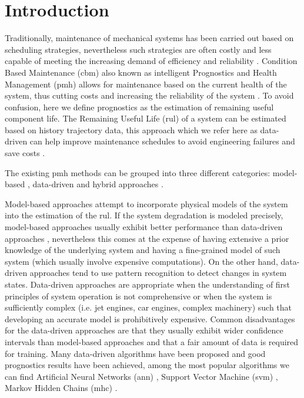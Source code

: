\section{Introduction}
\label{sec:rul_intro}

Traditionally, maintenance of mechanical systems has been carried out based on scheduling strategies, nevertheless such strategies are often costly and less capable of meeting the increasing demand of efficiency and reliability \cite{Gebraeel2005, Zaidan2013}. Condition Based Maintenance (\gls{cbm}) also known as intelligent Prognostics and Health Management (\gls{pmh}) allows for maintenance based on the current health of the system, thus cutting costs and increasing the reliability of the system \cite{Zhao2017}. To avoid confusion, here we define prognostics as the estimation of remaining useful component life. The Remaining Useful Life (\gls{rul}) of a system can be estimated based on history trajectory data, this approach which we refer here as data-driven can help improve maintenance schedules to avoid engineering failures and save costs \cite{Lee2014}.

The existing \gls{pmh} methods can be grouped into three different categories: model-based \cite{Yu2001} , data-driven \cite{Liu2009, Mosallam2013} and hybrid approaches \cite{Pecht2010, Liu2012}.

Model-based approaches attempt to incorporate physical models of the system into the estimation of the \gls{rul}. If the system degradation is modeled  precisely, model-based approaches usually exhibit better performance than data-driven approaches \cite{Qian2017}, nevertheless this comes at the expense of having extensive a prior knowledge of the underlying system and having a fine-grained model of such system (which usually involve expensive computations). On the other hand, data-driven approaches tend to use pattern recognition to detect changes in system states. Data-driven approaches are appropriate when the understanding of first principles of system operation is not comprehensive or when the system is sufficiently complex (i.e. jet engines, car engines, complex machinery) such that developing an accurate model is prohibitively expensive. Common disadvantages for the data-driven approaches are that they usually exhibit wider confidence intervals than model-based approaches and that a fair amount of data is required for training. Many data-driven algorithms have been proposed and good prognostics results have been achieved, among the most popular algorithms we can find Artificial Neural Networks (\gls{ann}) \cite{Gebraeel2004}, Support Vector Machine (\gls{svm}) \cite{Benkedjouh2013}, Markov Hidden Chains (\gls{mhc}) \cite{Dong2007}.

